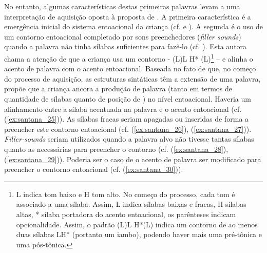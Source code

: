 \documentclass[output=paper]{LSP/langsci}
\begin{document}
No entanto, algumas características destas primeiras palavras levam a uma interpretação de aquisição oposta à proposta de \citet{demuth1996}. A primeira característica é a emergência inicial do sistema entoacional da criança (cf. \citealt{gebara1984} e \citealt{frotavigario1994}). A segunda é o uso de um contorno entoacional completado por sons preenchedores (\textit{filler sounds}) quando a palavra não tinha sílabas suficientes para fazê-lo (cf. \citealt{scarpa1997}). Esta autora chama a atenção de que a criança usa um contorno - (L)L H* (L)\footnote{L indica tom baixo e H tom alto. No começo do processo, cada tom é associado a uma sílaba. Assim, L indica sílabas baixas e fracas, H sílabas altas, * sílaba portadora do acento entoacional, os parênteses indicam opcionalidade. Assim, o padrão (L)L H*(L) indica um contorno de ao menos duas sílabas LH* (portanto um iambo), podendo haver mais uma pré-tônica e uma pós-tônica.} – e alinha o acento de palavra com o acento entoacional. Baseada no fato de que, no começo do processo de aquisição, as estruturas sintáticas têm a extensão de uma palavra, \citet{santos2001} propõe que a criança ancora a produção de palavra (tanto em termos de quantidade de sílabas quanto de posição de ) no nível entoacional. Haveria um alinhamento entre a sílaba acentuada na palavra e o acento entoacional (cf. (\ref{ex:santana_25})). As sílabas fracas seriam apagadas ou inseridas de forma a preencher este contorno entoacional (cf. (\ref{ex:santana_26}), (\ref{ex:santana_27})). \textit{Filler-sounds} seriam utilizados quando a palavra alvo não tivesse tantas sílabas quanto as necessárias para preencher o contorno (cf. (\ref{ex:santana_28}), (\ref{ex:santana_29})). Poderia ser o caso de o acento de palavra ser modificado para preencher o contorno entoacional (cf. (\ref{ex:santana_30})).
\end{document}

